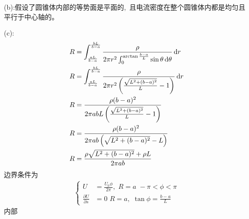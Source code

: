 (b):假设了圆锥体内部的等势面是平面的, \,且电流密度在整个圆锥体内都是均匀且平行于中心轴的。

(c):
\begin{align*}
    R&=\int_{\frac{aL}{b-a}}^{\frac{bL}{b-a}}\frac{\rho}{2\pi r^2\int_{0}^{\arctan \frac{b-a}{L}}\sin\theta\dif \theta}\dif r\\
    R&=\int_{\frac{aL}{b-a}}^{\frac{bL}{b-a}}\frac{\rho}{2\pi r^2\left(\frac{\sqrt{L^2+(b-a)^2}}{L}-1\right)}\dif r\\
    R&=\frac{\rho(b-a)^2}{2\pi abL\left(\frac{\sqrt{L^2+(b-a)^2}}{L}-1\right)}\\
    R&=\frac{\rho(b-a)^2}{2\pi ab\left(\sqrt{L^2+(b-a)^2}-L\right)}\\
    R&=\frac{\rho\sqrt{L^2+(b-a)^2}+\rho L}{2\pi ab}
\end{align*}
边界条件为
\begin{align*}
    \left\{
    \begin{aligned}
        U&=\frac{U_0\phi}{2\pi},\, \,R=a\, \,-\pi<\phi<\pi\\
        \frac{\partial U}{\partial s}&=0\, \,R=a,\, \,\tan\phi=\frac{b-a}{L}
    \end{aligned}
    \right.
\end{align*}
内部
